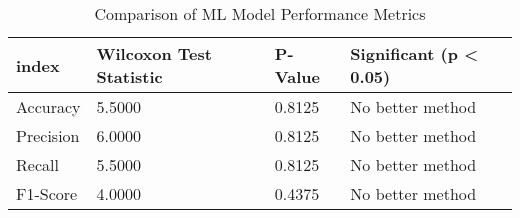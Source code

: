 \begin{table}[htbp]
\caption{Comparison of ML Model Performance Metrics}
\label{tab:model_comparison}
\begin{tabular}{llll}
\toprule
index & Wilcoxon Test Statistic & P-Value & Significant (p < 0.05) \\
\midrule
Accuracy & 5.5000 & 0.8125 & No better method \\
Precision & 6.0000 & 0.8125 & No better method \\
Recall & 5.5000 & 0.8125 & No better method \\
F1-Score & 4.0000 & 0.4375 & No better method \\
\bottomrule
\end{tabular}
\end{table}
